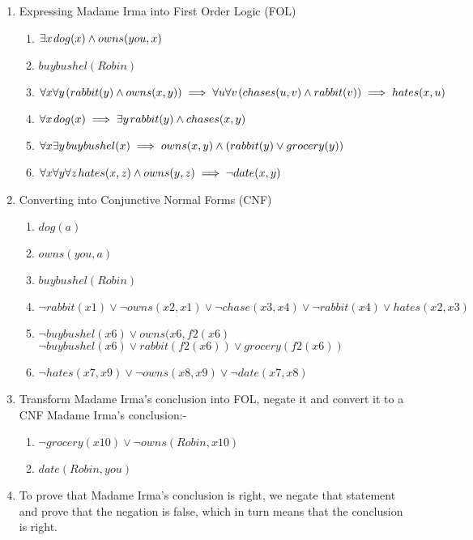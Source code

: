 \documentclass[11pt]{article}
\begin{document}
\begin{enumerate}
	\item Expressing  Madame Irma into  First Order Logic (FOL) 
	\begin{enumerate}
		\item $\exists x \mkern2mu  dog(x) \land owns(you,x)$
		\item  $buybushel(Robin)$
		\item $\forall x \forall y \mkern2mu  ( rabbit(y) \land owns(x,y) ) \implies \forall u \forall v \mkern2mu ( chases(u,v) \land rabbit(v) ) \implies hates(x,u)$
		\item $\forall x \mkern2mu  dog(x) \implies \exists y \mkern2mu rabbit(y) \land chases(x,y)$
		\item $\forall x \exists y \mkern2mu  buybushel(x) \implies owns(x,y) \land ( rabbit(y) \lor grocery(y))$  
		\item $\forall x \forall y \forall z  \mkern2mu  hates(x,z) \land owns(y,z) \implies \neg date(x,y) $ 
	\end{enumerate}
\item Converting into Conjunctive Normal Forms (CNF)
	\begin{enumerate}
		\item $dog(a)$
		\item $owns(you,a)$
		\item $buybushel(Robin)$  
		\item $\neg rabbit(x1) \lor \neg owns(x2,x1) \lor \neg chase(x3,x4) \lor \neg rabbit(x4) \lor hates(x2,x3)$
		\item $\neg buybushel(x6) \lor owns(x6,f2(x6)$\newline  $\neg buybushel(x6) \lor rabbit(f2(x6)) \lor grocery(f2(x6))$
		\item $\neg hates(x7,x9) \lor \neg owns(x8,x9) \lor \neg date(x7,x8)$
	\end{enumerate}
\item Transform Madame Irma’s conclusion into FOL, negate it and convert it to a CNF Madame Irma's conclusion:-
	\begin{enumerate}
		\item $ \neg grocery(x10) \lor \neg owns(Robin,x10)$\newline
		\item $ date(Robin,you)$
	\end{enumerate}
\item To prove that Madame Irma's conclusion is right, we negate that statement and prove that the negation is false, which in turn means that the conclusion is right.
\begin{enumerate}


\end{enumerate}
\end{enumerate}
\end{document}
